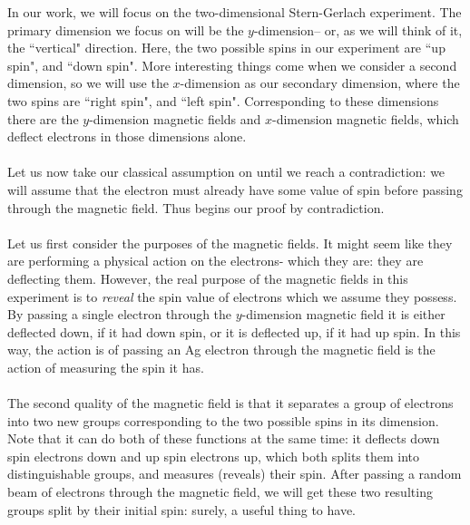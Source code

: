        In our work, we will focus on the two-dimensional Stern-Gerlach experiment. The primary dimension we focus on will be the $y$-dimension-- or, as we will think of it, the ``vertical" direction. Here, the two possible spins in our experiment are ``up spin", and ``down spin". More interesting things come when we consider a second dimension, so we will use the $x$-dimension as our secondary dimension, where the two spins are ``right spin", and ``left spin". Corresponding to these dimensions there are the $y$-dimension magnetic fields and $x$-dimension magnetic fields, which deflect electrons in those dimensions alone.
\\\\
Let us now take our classical assumption on until we reach a contradiction: we will assume that the electron must already have some value of spin before passing through the magnetic field. Thus begins our proof by contradiction.
\\\\
Let us first consider the purposes of the magnetic fields. It might seem like they are performing a physical action on the electrons- which they are: they are deflecting them. However, the real purpose of the magnetic fields in this experiment is to \textit{reveal} the spin value of electrons which we assume they possess. By passing a single electron through the $y$-dimension magnetic field it is either deflected down, if it had down spin, or it is deflected up, if it had up spin. In this way, the action is of passing an Ag electron through the magnetic field is the action of measuring the spin it has. 
\\\\
The second quality of the magnetic field is that it separates a group of electrons into two new groups corresponding to the two possible spins in its dimension. Note that it can do both of these functions at the same time: it deflects down spin electrons down and up spin electrons up, which both splits them into distinguishable groups, and measures (reveals) their spin. After passing a random beam of electrons through the magnetic field, we will get these two resulting groups split by their initial spin: surely, a useful thing to have. 
\\\\
